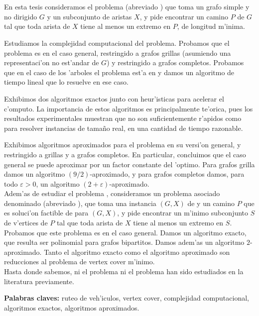 \chapter*{\runtitulo}

En esta tesis consideramos el problema  (abreviado ) que toma un grafo simple y no dirigido $G$ y un subconjunto de aristas $X$, y pide encontrar un camino $P$ de $G$ tal que toda arista de $X$ tiene al menos un extremo en $P$, de longitud m'inima.

Estudiamos la complejidad computacional del problema. Probamos que el problema es  en el caso general, restringido a grafos grillas (asumiendo una representaci'on no est'andar de $G$) y restringido a grafos completos. Probamos que en el caso de los 'arboles el problema est'a en  y damos un algoritmo de tiempo lineal que lo resuelve en ese caso.

Exhibimos dos algoritmos exactos junto con heur'isticas para acelerar el c'omputo. La importancia de estos algoritmos es principalmente te'orica, pues los resultados experimentales muestran que no son suficientemente r'apidos como para resolver instancias de tama\~no real, en una cantidad de tiempo razonable.

Exhibimos algoritmos aproximados para el problema en su versi'on general, y restringido a grillas y a grafos completos. En particular, concluimos que el caso general se puede aproximar por un factor constante del 'optimo. Para grafos grilla damos un algoritmo $(9/2)$-aproximado, y para grafos completos damos, para todo $\varepsilon > 0$, un algoritmo $(2 + \varepsilon)$-aproximado.\\

Adem'as de estudiar el problema , consideramos un problema asociado denominado  (abreviado ), que toma una instancia $(G, X)$ de  y un camino $P$ que es soluci'on factible de  para $(G, X)$, y pide encontrar un m'inimo subconjunto $S$ de v'ertices de $P$ tal que toda arista de $X$ tiene al menos un extremo en $S$. Probamos que este problema es  en el caso general. Damos un algoritmo exacto, que resulta ser polinomial para grafos bipartitos. Damos adem'as un algoritmo $2$-aproximado. Tanto el algoritmo exacto como el algoritmo aproximado son reducciones al problema de vertex cover m'inimo.\\

Hasta donde sabemos, ni el problema  ni el problema  han sido estudiados en la literatura previamente.

\bigskip

\noindent\textbf{Palabras claves:} ruteo de veh'iculos, vertex cover, complejidad computacional, algoritmos exactos, algoritmos aproximados.